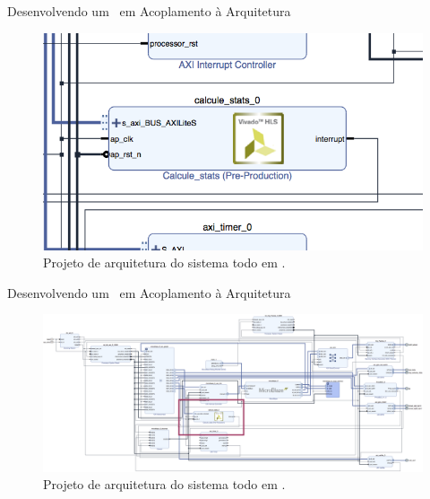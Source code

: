 \begin{frame}{Desenvolvendo um \Wearable\ em \Hardware }{Acoplamento à Arquitetura}
\vspace{-0.8em}
\begin{figure}[h] \centering
    \includegraphics[width=1\textwidth]{img/vivado_hardware/ligado.png}
    \vspace{-1em}
    \caption{Projeto de arquitetura do sistema todo em \hardware.}
\end{figure}
\end{frame}


\begin{frame}{Desenvolvendo um \Wearable\ em \Hardware }{Acoplamento à Arquitetura}
\vspace{-0.8em}
\begin{figure}[h] \centering
    \includegraphics[width=1\textwidth]{img/vivado_hardware/all.png}
    \vspace{-1em}
    \caption{Projeto de arquitetura do sistema todo em \hardware.}
\end{figure}
\end{frame}


